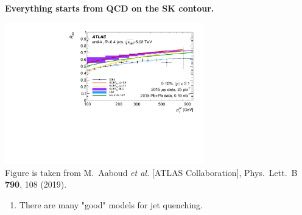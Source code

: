 \documentclass[9pt,a4paper,unknownkeysallowed,xcolor=dvipsnames,aspectratio=43]{beamer}
\begin{document}
%
%
\begin{frame}{\bf\huge Everything starts from QCD on the SK contour.}	\vspace{4mm}
\begin{center}
\includegraphics[width=0.65\textwidth]{fig/RAA_jet}\\
{\tiny  Figure is taken from {\color{teablue}
M.~Aaboud {\it et al.} [ATLAS Collaboration],
  Phys.\ Lett.\ B {\bf 790}, 108 (2019).
  }}
\end{center}
\vspace{2mm}
\begin{enumerate}
\item{\large There are many "good" models for jet quenching.}
\end{enumerate}
\end{frame}
\end{document}
